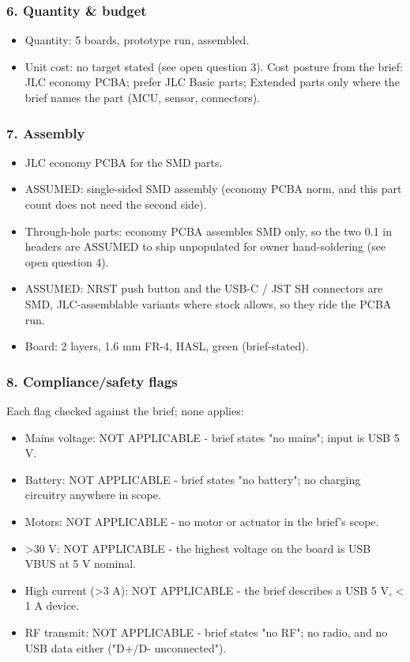 \documentclass[11pt,a4paper]{article}
\begin{document}
\subsubsection*{6. Quantity \& budget}
\begin{itemize}
\item Quantity: 5 boards, prototype run, assembled.
\item Unit cost: no target stated (see open question 3). Cost posture from the
brief: JLC economy PCBA; prefer JLC Basic parts; Extended parts only where
the brief names the part (MCU, sensor, connectors).
\end{itemize}
\subsubsection*{7. Assembly}
\begin{itemize}
\item JLC economy PCBA for the SMD parts.
\item ASSUMED: single-sided SMD assembly (economy PCBA norm, and this part count
does not need the second side).
\item Through-hole parts: economy PCBA assembles SMD only, so the two 0.1 in
headers are ASSUMED to ship unpopulated for owner hand-soldering (see open
question 4).
\item ASSUMED: NRST push button and the USB-C / JST SH connectors are SMD,
JLC-assemblable variants where stock allows, so they ride the PCBA run.
\item Board: 2 layers, 1.6 mm FR-4, HASL, green (brief-stated).
\end{itemize}
\subsubsection*{8. Compliance/safety flags}
Each flag checked against the brief; none applies:

\begin{itemize}
\item Mains voltage: NOT APPLICABLE - brief states "no mains"; input is USB 5 V.
\item Battery: NOT APPLICABLE - brief states "no battery"; no charging circuitry
anywhere in scope.
\item Motors: NOT APPLICABLE - no motor or actuator in the brief's scope.
\item \textgreater{}30 V: NOT APPLICABLE - the highest voltage on the board is USB VBUS at
5 V nominal.
\item High current (\textgreater{}3 A): NOT APPLICABLE - the brief describes a USB 5 V,
\textless{} 1 A device.
\item RF transmit: NOT APPLICABLE - brief states "no RF"; no radio, and no USB
data either ("D+/D- unconnected").
\end{itemize}
\end{document}
